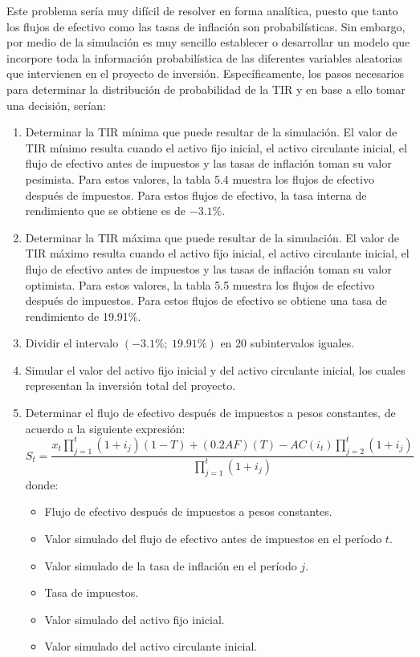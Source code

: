 \documentclass[11pt,letterpaper]{report}
\begin{document}
Este problema sería muy difícil de resolver en forma analítica, puesto que
tanto los flujos de efectivo como las tasas de inflación son
probabilísticas. Sin embargo, por medio de la simulación es muy sencillo
establecer o desarrollar un modelo que incorpore toda la información
probabilística de las diferentes variables aleatorias que intervienen en el
proyecto de inversión. Específicamente, los pasos necesarios para
determinar la distribución de probabilidad de la TIR y en base a ello tomar
una decisión, serían:

\begin{enumerate}[label=\arabic*.]
\item Determinar la TIR mínima que puede resultar de la simulación. El
valor de TIR mínimo resulta cuando el activo fijo inicial, el activo
circulante inicial, el flujo de efectivo antes de impuestos y las tasas de
inflación toman su valor pesimista. Para estos valores, la tabla 5.4
muestra los flujos de efectivo después de impuestos. Para estos flujos de
efectivo, la tasa interna de rendimiento que se obtiene es de $-3.1\%$.

\item Determinar la TIR máxima que puede resultar de la simulación. El
valor de TIR máximo resulta cuando el activo fijo inicial, el activo
circulante inicial, el flujo de efectivo antes de impuestos y las tasas de
inflación toman su valor optimista. Para estos valores, la tabla 5.5
muestra los flujos de efectivo después de impuestos. Para estos flujos de
efectivo se obtiene una tasa de rendimiento de 19.91\%.

\item Dividir el intervalo $(-3.1\%;\ 19.91\%)$ en 20 subintervalos iguales.

\item Simular el valor del activo fijo inicial y del activo circulante
inicial, los cuales representan la inversión total del proyecto.

\item Determinar el flujo de efectivo después de impuestos a pesos
constantes, de acuerdo a la siguiente expresión:
\[
S_t=\frac{x_t\displaystyle\prod_{j=1}^{t}(1+i_j)(1-T)+(0.2AF)(T)-AC(i_t)\displaystyle\prod_{j=2}^{t}(1+i_j)}{\displaystyle\prod_{j=1}^{t}(1+i_j)}
\]
donde:
\begin{itemize}[leftmargin=3.5cm]
\item[$S_t=$] Flujo de efectivo después de impuestos a pesos constantes.
\item[$x_t=$] Valor simulado del flujo de efectivo antes de impuestos en el período $t$.
\item[$i_j=$] Valor simulado de la tasa de inflación en el período $j$.
\item[$T=$] Tasa de impuestos.
\item[$AF=$] Valor simulado del activo fijo inicial.
\item[$AC=$] Valor simulado del activo circulante inicial.
\end{itemize}


\end{enumerate}
\end{document}
